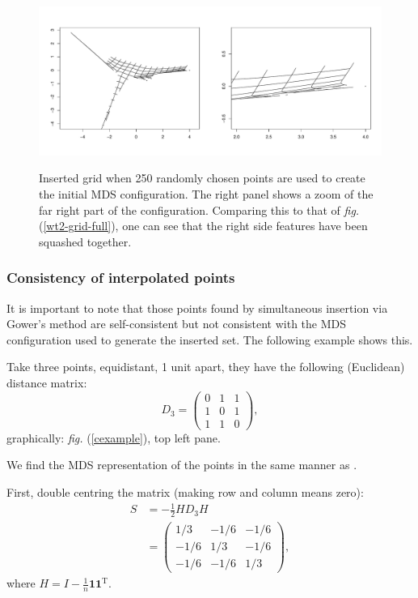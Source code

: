 \documentclass[a4paper,10pt]{article}
\newcommand{\fig}[1]{\emph{fig.} (\ref{#1})}
\begin{document}
\begin{figure}
\centering
\includegraphics[width=5in]{figs/wt2-grid-samp.pdf} \\
\caption{Inserted grid when 250 randomly chosen points are used to create the initial MDS configuration. The right panel shows a zoom of the far right part of the configuration. Comparing this to that of \fig{wt2-grid-full}, one can see that the right side features have been squashed together.}
\label{wt2-grid-samp}
\end{figure}


\subsubsection{Consistency of interpolated points}

It is important to note that those points found by simultaneous insertion via Gower's method are self-consistent but not consistent with the MDS configuration used to generate the inserted set. The following example shows this.

Take three points, equidistant, 1 unit apart, they have the following (Euclidean) distance matrix:
\begin{equation*}
D_3 = \begin{pmatrix} 0 & 1& 1\\1 & 0 & 1\\ 1 & 1 & 0\end{pmatrix},
\end{equation*}
graphically: \fig{cexample}, top left pane.

We find the MDS representation of the points in the same manner as \cite{diaconis08}.

First, double centring the matrix (making row and column means zero):
\begin{equation*}
\begin{aligned}
S &= -\frac{1}{2} HD_3H\\
    &= \begin{pmatrix} 1/3 & -1/6 & -1/6\\-1/6 & 1/3 & -1/6\\ -1/6 & -1/6 & 1/3\end{pmatrix},
\end{aligned}
\end{equation*}
where $H=I-\frac{1}{n}\mathbf{1}\mathbf{1}^\text{T}$.
\end{document}
